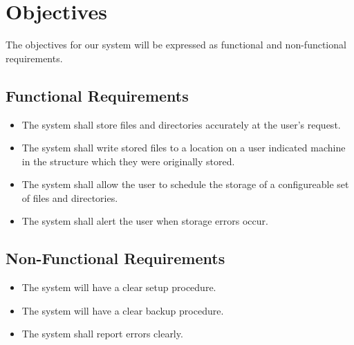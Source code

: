 \section{Objectives}
The objectives for our system will be expressed as functional and non-functional requirements.
\subsection{Functional Requirements}
\begin{itemize}
	\item The system shall store files and directories accurately at the user's request.
	\item The system shall write stored files to a location on a user indicated machine in the structure which they were originally stored.
	\item The system shall allow the user to schedule the storage of a configureable set of files and directories.
	\item The system shall alert the user when storage errors occur.
\end{itemize}
\subsection{Non-Functional Requirements}
\begin{itemize}
	\item The system will have a clear setup procedure.
	\item The system will have a clear backup procedure.
	\item The system shall report errors clearly.
\end{itemize}

